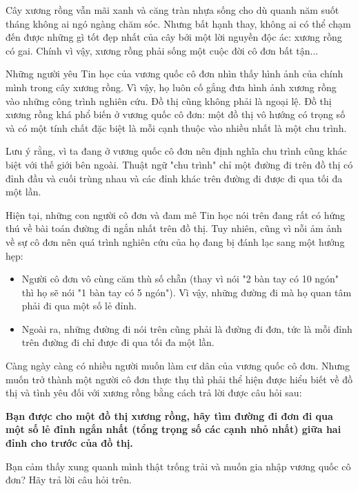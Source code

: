 Cây xương rồng vẫn mãi xanh và căng tràn nhựa sống cho dù quanh năm suốt tháng không ai ngó ngàng chăm sóc. Nhưng bất hạnh thay, không ai có thể chạm đến được những gì tốt đẹp nhất của cây bởi một lời nguyền độc ác: xương rồng có gai. Chính vì vậy, xương rồng phải sống một cuộc đời cô đơn bất tận...

   Những người yêu Tin học của vương quốc cô đơn nhìn thấy hình ảnh của chính mình trong cây xương rồng. Vì vậy, họ luôn cố gắng đưa hình ảnh xương rồng vào những công trình nghiên cứu. Đồ thị cũng không phải là ngoại lệ. Đồ thị xương rồng khá phổ biến ở vương quốc cô đơn: một đồ thị vô hướng có trọng số và có một tính chất đặc biệt là mỗi cạnh thuộc vào nhiều nhất là một chu trình.  

   Lưu ý rằng, vì ta đang ở vương quốc cô đơn nên định nghĩa chu trình cũng khác biệt với thế giới bên ngoài. Thuật ngữ "chu trình" chỉ một đường đi trên đồ thị có đỉnh đầu và cuối trùng nhau và các đỉnh khác trên đường đi được đi qua tối đa một lần.  

   Hiện tại, những con người cô đơn và đam mê Tin học nói trên đang rất có hứng thú về bài toán đường đi ngắn nhất trên đồ thị. Tuy nhiên, cũng vì nỗi ảm ảnh về sự cô đơn nên quá trình nghiên cứu của họ đang bị đánh lạc sang một hướng hẹp:  
\begin{itemize}
	\item     Người cô đơn vô cùng căm thù số chẵn (thay vì nói "2 bàn tay có 10 ngón" thì họ sẽ nói "1 bàn tay có 5 ngón"). Vì vậy, những đường đi mà họ quan tâm phải đi qua một số lẻ đỉnh.   
	\item     Ngoài ra, những đường đi nói trên cũng phải là đường đi đơn, tức là mỗi đỉnh trên đường đi chỉ được đi qua tối đa một lần.   
\end{itemize}

   Càng ngày càng có nhiều người muốn làm cư dân của vương quốc cô đơn. Nhưng muốn trở thành một người cô đơn thực thụ thì phải thể hiện được hiểu biết về đồ thị và tình yêu đối với xương rồng bằng cách trả lời được câu hỏi sau:  

\textbf{Bạn được cho một đồ thị xương rồng, hãy tìm đường đi đơn đi qua một số lẻ đỉnh ngắn nhất (tổng trọng số các cạnh nhỏ nhất) giữa hai đỉnh cho trước của đồ thị.}

   Bạn cảm thấy xung quanh mình thật trống trải và muốn gia nhập vương quốc cô đơn? Hãy trả lời câu hỏi trên.